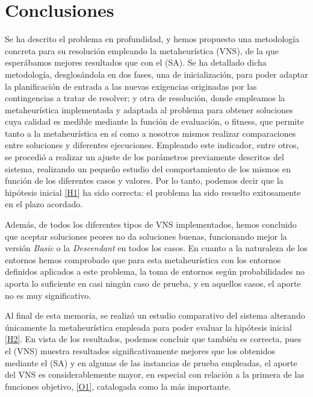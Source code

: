 \graphicspath{{capitulos/Capitulo6-Conclusiones/recursos/}}


\section{Conclusiones} \label{capitulo:6}

Se ha descrito el problema en profundidad, y hemos propuesto una metodología concreta para su resolución empleando la metaheurística \vns{} (VNS), de la que esperábamos mejores resultados que con el \sa{} (SA). Se ha detallado dicha metodología, desglosándola en dos fases, una de inicialización, para poder adaptar la planificación de entrada a las nuevas exigencias originadas por las contingencias a tratar de resolver; y otra de resolución, donde empleamos la metaheurística implementada y adaptada al problema para obtener soluciones cuya calidad es medible mediante la función de evaluación, o fitness, que permite tanto a la metaheurística en sí como a nosotros mismos realizar comparaciones entre soluciones y diferentes ejecuciones. Empleando este indicador, entre otros, se procedió a realizar un ajuste de los parámetros previamente descritos del sistema, realizando un pequeño estudio del comportamiento de los mismos en función de los diferentes casos y valores. Por lo tanto, podemos decir que la hipótesis inicial \ref{H1} ha sido correcta: el problema ha sido resuelto exitosamente en el plazo acordado.

Además, de todos los diferentes tipos de VNS implementados, hemos concluido que aceptar soluciones peores no da soluciones buenas, funcionando mejor la versión \textit{Basic} o la \textit{Descendant} en todos los casos. En cuanto a la naturaleza de los entornos hemos comprobado que para esta metaheurística con los entornos definidos aplicados a este problema, la toma de entornos según probabilidades no aporta lo suficiente en casi ningún caso de prueba, y en aquellos casos, el aporte no es muy significativo.

Al final de esta memoria, se realizó un estudio comparativo del sistema alterando únicamente la metaheurística empleada para poder evaluar la hipótesis inicial \ref{H2}. En vista de los resultados, podemos concluir que también es correcta, pues el \vns{} (VNS) muestra resultados significativamente mejores que los obtenidos mediante el \sa{} (SA) y en algunas de las instancias de prueba empleadas, el aporte del VNS es considerablemente mayor, en especial con relación a la primera de las funciones objetivo, \ref{O1}, catalogada como la más importante.

